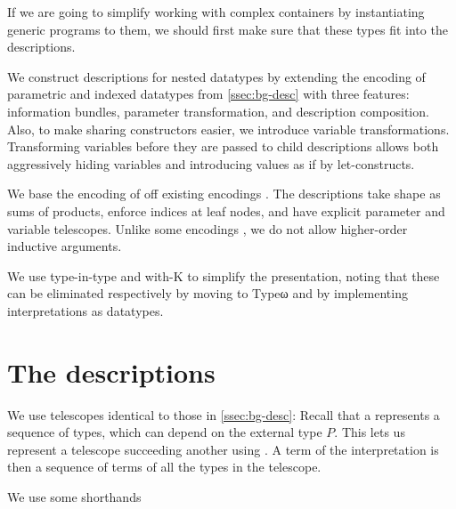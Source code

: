 

If we are going to simplify working with complex containers %
by instantiating generic programs to them, we should first make sure that these types fit into the descriptions.

We construct descriptions for nested datatypes by extending the encoding of parametric and indexed datatypes from \autoref{ssec:bg-desc} with three features: information bundles, parameter transformation, and description composition. Also, to make sharing constructors easier, we introduce variable transformations. Transforming variables before they are passed to child descriptions allows both aggressively hiding variables and introducing values as if by let-constructs.

We base the encoding of off existing encodings \cite{sijsling,practgen}. The descriptions take shape as sums of products, enforce indices at leaf nodes, and have explicit parameter and variable telescopes. Unlike some encodings \cite{effectfully, practgen}, we do not allow higher-order inductive arguments. 

We use type-in-type and with-K to simplify the presentation, noting that these can be eliminated respectively by moving to Typeω and by implementing interpretations as datatypes.

\section{The descriptions}\label{ssec:desc}
We use telescopes identical to those in \autoref{ssec:bg-desc}:
Recall that a  represents a sequence of types, which can depend on the external type $P$. This lets us represent a telescope succeeding another using . A term of the interpretation  is then a sequence of terms of all the types in the telescope.

We use some shorthands

